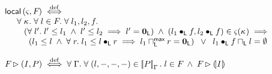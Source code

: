 %
%
\[
\begin{array}{l}
	\local{\amod{}}{\fence{}} \iffdef\\
	\hspace*{0.5cm}
	\for{\ca{}} \for{l \in \fence{}} \for{l_1, l_2, f}\\
	\hspace*{0.8cm} (\for{l'} l' \leq l_1 \;\land\; l' \leq l_2 \implies l' = \unitL) \;\land\; (l_1 \composeL f, l_2 \composeL f) \in \amod{}(\ca{})  \implies \\
	 \hspace*{1cm} \left(l_1 \leq l \;\land\; \for{r} l_1 \leq l \composeL r \implies l_1 \maxMeetL r = \unitL\right) \;\;\lor\;\; l_1 \composeL f \meetL l = \emptyset\\\\
	 
 \fence{} \fences (I, P) \iffdef  
 \for{\lenv} \for{(l, -, -, -) \in \sem[\lenv]{P}} l  \in \fence{} \;\land\; \fence{} \fences \intermediateSemI{I}
\end{array}
\]
%
%
%
%	
%	
%	
%	

